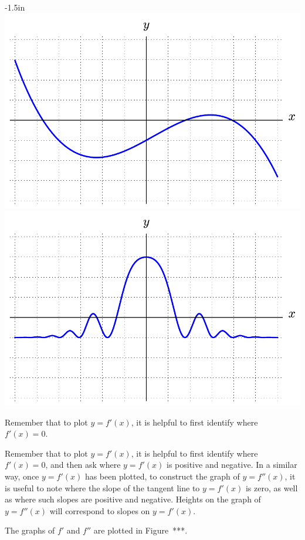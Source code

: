 \begin{adjustwidth*}{}{-1.5in}
\includegraphics[scale=.5]{figs/2/2-3_Act2a.pdf}
\includegraphics[scale=.5]{figs/2/2-3_Act2b.pdf}
\end{adjustwidth*}

\begin{smallhint}
Remember that to plot $y = f'(x)$, it is helpful to first identify where $f'(x) = 0.$
\end{smallhint}
\begin{bighint}
Remember that to plot $y = f'(x)$, it is helpful to first identify where $f'(x) = 0$, and then ask where $y = f'(x)$ is positive and negative.  In a similar way, once $y = f'(x)$ has been plotted, to construct the graph of $y=f''(x)$, it is useful to note where the slope of the tangent line to $y = f'(x)$ is zero, as well as where such slopes are positive and negative.  Heights on the graph of $y = f''(x)$ will correspond to slopes on $y = f'(x)$.
\end{bighint}
\begin{activitySolution}
The graphs of $f'$ and $f''$ are plotted in Figure~***.
\end{activitySolution}
\aftera